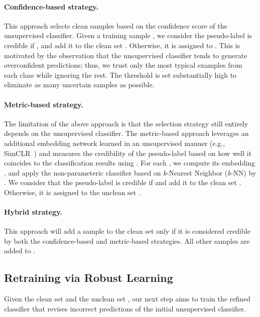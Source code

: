 \documentclass[final]{cvpr}
\newcommand{\cutparagraphup}{\vspace*{-0.15in}}
\begin{document}
\vspace{-1mm}
\cutparagraphup
\paragraph{Confidence-based strategy.} 
This approach selects clean samples based on the confidence score of the unsupervised classifier.
Given a training sample , we consider the pseudo-label  is credible if , and add it to the clean set . Otherwise, it is assigned to .
This is motivated by the observation that the unsupervised classifier tends to generate overconfident predictions; thus, we trust only the most typical examples from each class while ignoring the rest. The threshold  is set substantially high to eliminate as many uncertain samples as possible.

\cutparagraphup
\paragraph{Metric-based strategy.} 
The limitation of the above approach is that the selection strategy still entirely depends on the unsupervised classifier. The metric-based approach leverages an additional embedding network  learned in an unsupervised manner (e.g., SimCLR~\cite{chen2020simple}) and measures the credibility of the pseudo-label based on how well it coincides to the classification results using .
For each , we compute its embedding , and apply the non-parameteric classifier based on \emph{k}-Nearest Neighbor (\emph{k}-NN) by .
We consider that the pseudo-label is credible if  and add it to the clean set . Otherwise, it is assigned to the unclean set .

\cutparagraphup
\paragraph{Hybrid strategy.} 
This approach will add a sample to the clean set  only if it is considered credible by both the confidence-based and metric-based strategies. All other samples are added to . 
 
\subsection{Retraining via Robust Learning}
\label{sec:semisup}
Given the clean set  and the unclean set , our next step aims to train the refined classifier  that revises incorrect predictions of the initial unsupervised classifier.

\cutparagraphup
\end{document}
